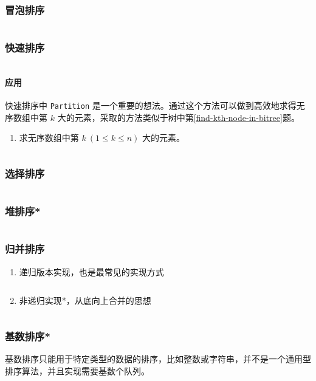 \documentclass{ctexart}
\begin{document}
\subsubsection{冒泡排序}
\inputminted{c}{codes/bubble-sort.c}

\subsubsection{快速排序}
\inputminted{c}{codes/quick-sort.c}
\paragraph{应用}
快速排序中 \texttt{Partition} 是一个重要的想法。通过这个方法可以做到高效地求得无序数组中第 $k$ 大的元素，采取的方法类似于树中第\ref{find-kth-node-in-bitree}题。
\begin{enumerate}
    \item 求无序数组中第 $k\ (1 \le k \le n)$ 大的元素。
        \inputminted{c}{codes/find-kth-in-unsort-array.c}
\end{enumerate}


\subsubsection{选择排序}
\inputminted{c}{codes/select-sort.c}

\subsubsection{堆排序*}
\inputminted{c}{codes/heap-sort.c}

\subsubsection{归并排序}
\begin{enumerate}
    \item 递归版本实现，也是最常见的实现方式
        \inputminted{c}{codes/merge-sort1.c}
    \item 非递归实现*，从底向上合并的思想
        \inputminted{c}{codes/merge-sort2.c}
\end{enumerate}

\subsubsection{基数排序*}
基数排序只能用于特定类型的数据的排序，比如整数或字符串，并不是一个通用型排序算法，并且实现需要基数个队列。
\inputminted{c}{codes/radix-sort.c}
\end{document}
